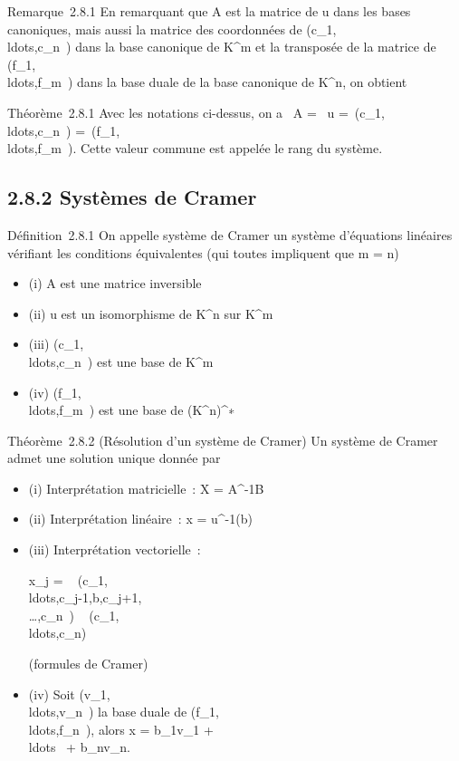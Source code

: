 \documentclass[]{article}
\begin{document}
Remarque~2.8.1 En remarquant que A est la matrice de u dans les bases
canoniques, mais aussi la matrice des coordonnées de
(c_1,\\ldots,c_n~)
dans la base canonique de K^m et la transposée de la matrice
de
(f_1,\\ldots,f_m~)
dans la base duale de la base canonique de K^n, on obtient

Théorème~2.8.1 Avec les notations ci-dessus, on a
\mathrmrg~A
= \mathrmrg~u
=\
\mathrmrg(c_1,\\ldots,c_n~)
=\
\mathrmrg(f_1,\\ldots,f_m~).
Cette valeur commune est appelée le rang du système.

\subsection{2.8.2 Systèmes de Cramer}

Définition~2.8.1 On appelle système de Cramer un système d'équations
linéaires vérifiant les conditions équivalentes (qui toutes impliquent
que m = n)

\begin{itemize}
\itemsep1pt\parskip0pt
\item
  (i) A est une matrice inversible
\item
  (ii) u est un isomorphisme de K^n sur K^m
\item
  (iii)
  (c_1,\\ldots,c_n~)
  est une base de K^m
\item
  (iv)
  (f_1,\\ldots,f_m~)
  est une base de (K^n)^∗
\end{itemize}

Théorème~2.8.2 (Résolution d'un système de Cramer) Un système de Cramer
admet une solution unique donnée par

\begin{itemize}
\item
  (i) Interprétation matricielle~: X = A^-1B
\item
  (ii) Interprétation linéaire~: x = u^-1(b)
\item
  (iii) Interprétation vectorielle~:

  x_j =
  ~
  (c_1,\\ldots,c_j-1,b,c_j+1,\\\ldots,c_n~)
  \over
  \mathrm{det}~
  (c_1,\\ldots,c_n)~

  (formules de Cramer)
\item
  (iv) Soit
  (v_1,\\ldots,v_n~)
  la base duale de
  (f_1,\\ldots,f_n~),
  alors x = b_1v_1 +
  \\ldots~ +
  b_nv_n.
\end{itemize}
\end{document}
